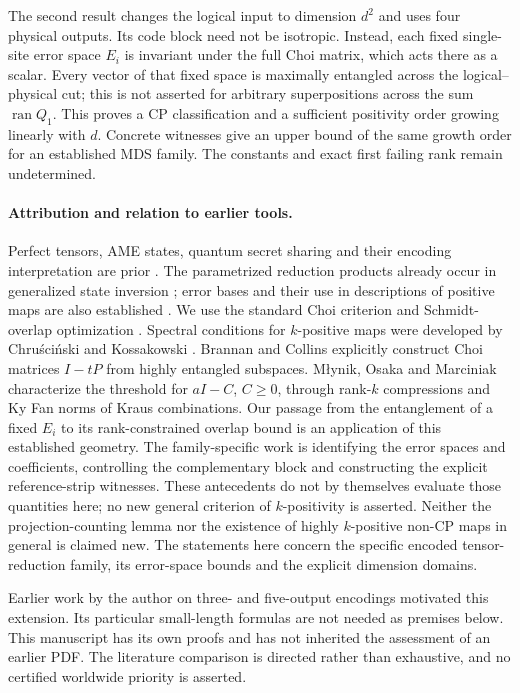 \documentclass[11pt,a4paper]{article}
\newcommand{\ran}{\operatorname{ran}}
\begin{document}
The second result changes the logical input to dimension \(d^2\) and uses four physical outputs. Its code block need not be isotropic. Instead, each fixed single-site error space \(E_i\) is invariant under the full Choi matrix, which acts there as a scalar. Every vector of that fixed space is maximally entangled across the logical--physical cut; this is not asserted for arbitrary superpositions across the sum \(\ran Q_1\). This proves a CP classification and a sufficient positivity order growing linearly with \(d\). Concrete witnesses give an upper bound of the same growth order for an established MDS family. The constants and exact first failing rank remain undetermined.

\paragraph{Attribution and relation to earlier tools.}
Perfect tensors, AME states, quantum secret sharing and their encoding interpretation are prior \cite{Helwig,MDS}. The parametrized reduction products already occur in generalized state inversion \cite{Eltschka}; error bases and their use in descriptions of positive maps are also established \cite{Bhat}. We use the standard Choi criterion \cite{Choi} and Schmidt-overlap optimization \cite{TH}. Spectral conditions for $k$-positive maps were developed by Chru\'sci\'nski and Kossakowski \cite[Theorems 1--2]{CK}. Brannan and Collins \cite[Section 4.2, Theorem 4.3]{BC} explicitly construct Choi matrices $I-tP$ from highly entangled subspaces. M{\l}ynik, Osaka and Marciniak \cite[Proposition 3.1 and Theorem 3.2]{MOM} characterize the threshold for $aI-C$, $C\ge0$, through rank-$k$ compressions and Ky Fan norms of Kraus combinations. Our passage from the entanglement of a fixed $E_i$ to its rank-constrained overlap bound is an application of this established geometry. The family-specific work is identifying the error spaces and coefficients, controlling the complementary block and constructing the explicit reference-strip witnesses. These antecedents do not by themselves evaluate those quantities here; no new general criterion of $k$-positivity is asserted. Neither the projection-counting lemma nor the existence of highly $k$-positive non-CP maps in general is claimed new. The statements here concern the specific encoded tensor-reduction family, its error-space bounds and the explicit dimension domains.

Earlier work by the author on three- and five-output encodings motivated this extension. Its particular small-length formulas are not needed as premises below. This manuscript has its own proofs and has not inherited the assessment of an earlier PDF. The literature comparison is directed rather than exhaustive, and no certified worldwide priority is asserted.
\end{document}
